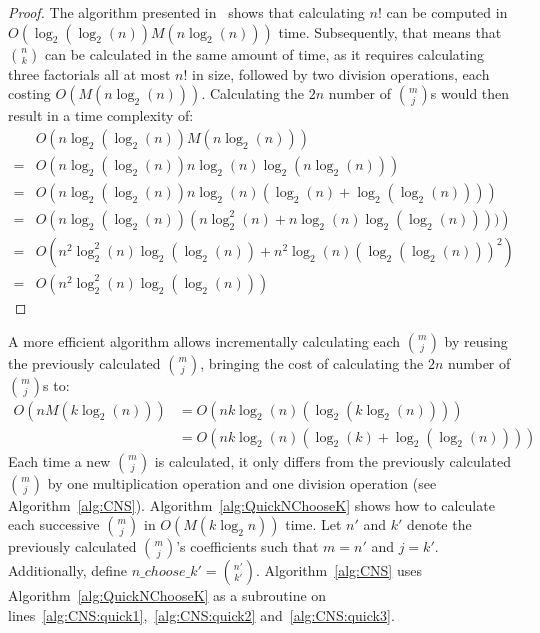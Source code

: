 \begin{proof}
The algorithm presented in~\cite{borwein1985complexity} shows that calculating $n!$ can be computed in $O\left(\log_2(\log_2 (n)) M(n \log_2 (n))\right)$ time. Subsequently, that means that ${n \choose k}$ can be calculated in the same amount of time, as it requires calculating three factorials all at most $n!$ in size, followed by two division operations, each costing $O\left(M(n \log_2 (n))\right)$. Calculating the $2n$ number of ${m \choose j}$s would then result in a time complexity of:
\begin{align}
&O\left(n\log_2(\log_2(n))M(n \log_2 (n))\right) \\
=&O\left(n\log_2(\log_2 (n))n \log_2 (n)\log_2 (n \log_2 (n))\right) \\
=&O\left(n\log_2 (\log_2 (n)) n \log_2 (n)(\log_2 (n) + \log_2(\log_2 (n)))\right) \\
=&O\left(n\log_2(\log_2 (n)) (n \log_2^2 (n) + n \log_2 (n) \log_2(\log_2 (n))))\right)\\
=&O\left(n^2 \log_2^2 (n) \log_2(\log_2 (n)) + n^2 \log_2 (n) (\log_2 (\log_2 (n)))^2\right) \\
=&O\left(n^2 \log_2^2 (n) \log_2(\log_2 (n))\right)
\end{align}
\end{proof}
A more efficient algorithm allows incrementally calculating each ${m \choose j}$ by reusing the previously calculated ${m \choose j}$, bringing the cost of calculating the $2n$ number of ${m \choose j}$s to:
\begin{align}
O\left(n M(k \log_2 (n))\right) &= O\left(n k \log_2 (n)(\log_2(k \log_2 (n)))\right)\\
&= O\left(n k \log_2 (n)(\log_2 (k) + \log_2(\log_2 (n)))\right)
\end{align}
Each time a new ${m \choose j}$ is calculated, it only differs from the previously calculated ${m \choose j}$ by one multiplication operation and one division operation (see Algorithm~\ref{alg:CNS}). Algorithm~\ref{alg:QuickNChooseK} shows how to calculate each successive ${m \choose j}$ in $O\left(M(k \log_2 n)\right)$ time. Let $n'$ and $k'$ denote the previously calculated ${m \choose j}$'s coefficients such that $m = n'$ and $j = k'$. Additionally, define $\mathit{n\_choose\_k'}= {n' \choose k'}$. Algorithm~\ref{alg:CNS} uses Algorithm~\ref{alg:QuickNChooseK} as a subroutine on lines~\ref{alg:CNS:quick1},~\ref{alg:CNS:quick2} and~\ref{alg:CNS:quick3}.


